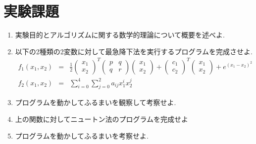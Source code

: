 \documentclass[12pt]{jarticle}
\begin{document}
\section{実験課題}
\begin{enumerate}
    \item 実験目的とアルゴリズムに関する数学的理論について概要を述べよ.
    \item 以下の2種類の2変数に対して最急降下法を実行するプログラムを完成させよ.
    \begin{eqnarray}
        f_1(x_1,x_2)&=&\frac{1}{2}
        \left(\begin{array}{r}
            x_1\\
            x_2
        \end{array}\right)^T\left(\begin{array}{rr}
            p&q\\
            q&r
        \end{array}\right)\left(\begin{array}{r}
            x_1\\
            x_2
        \end{array}\right)+\left(\begin{array}{r}
            c_1\\
            c_2
        \end{array}\right)^T\left(\begin{array}{r}
            x_1\\
            x_2
        \end{array}\right)+e^{(x_1-x_2)^2}\nonumber\\
        f_2(x_1,x_2)&=&\sum^4_{i=0}\sum^2_{j=0}a_{ij}x^i_1x^j_2\nonumber
    \end{eqnarray}
    \item プログラムを動かしてふるまいを観察して考察せよ.
    \item 上の関数に対してニュートン法のプログラムを完成せよ
    \item プログラムを動かしてふるまいを考察せよ.
\end{enumerate}
\end{document}
